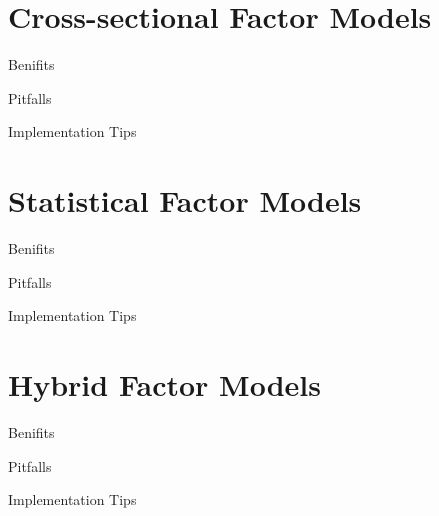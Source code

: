 \section{Cross-sectional Factor
Models}\label{cross-sectional-factor-models-1}

\begin{frame}{Benifits}

\end{frame}

\begin{frame}{Pitfalls}

\end{frame}

\begin{frame}{Implementation Tips}

\end{frame}

\section{Statistical Factor Models}\label{statistical-factor-models-1}

\begin{frame}{Benifits}

\end{frame}

\begin{frame}{Pitfalls}

\end{frame}

\begin{frame}{Implementation Tips}

\end{frame}

\section{Hybrid Factor Models}\label{hybrid-factor-models-1}

\begin{frame}{Benifits}

\end{frame}

\begin{frame}{Pitfalls}

\end{frame}

\begin{frame}{Implementation Tips}

\end{frame}
